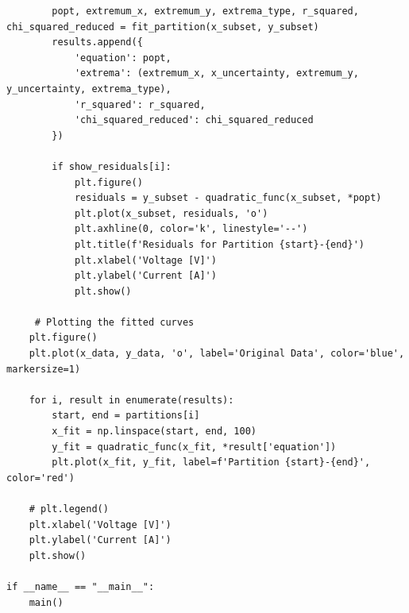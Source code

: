 \documentclass[12pt]{article}
\begin{document}
\begin{lstlisting}
        popt, extremum_x, extremum_y, extrema_type, r_squared, chi_squared_reduced = fit_partition(x_subset, y_subset)
        results.append({
            'equation': popt,  
            'extrema': (extremum_x, x_uncertainty, extremum_y, y_uncertainty, extrema_type), 
            'r_squared': r_squared,
            'chi_squared_reduced': chi_squared_reduced
        })

        if show_residuals[i]:
            plt.figure()  
            residuals = y_subset - quadratic_func(x_subset, *popt)
            plt.plot(x_subset, residuals, 'o')
            plt.axhline(0, color='k', linestyle='--')  
            plt.title(f'Residuals for Partition {start}-{end}')
            plt.xlabel('Voltage [V]')  
            plt.ylabel('Current [A]')
            plt.show()

     # Plotting the fitted curves 
    plt.figure()  
    plt.plot(x_data, y_data, 'o', label='Original Data', color='blue', markersize=1) 

    for i, result in enumerate(results):
        start, end = partitions[i] 
        x_fit = np.linspace(start, end, 100)  
        y_fit = quadratic_func(x_fit, *result['equation'])
        plt.plot(x_fit, y_fit, label=f'Partition {start}-{end}', color='red')

    # plt.legend()
    plt.xlabel('Voltage [V]')  
    plt.ylabel('Current [A]')
    plt.show()

if __name__ == "__main__":
    main()
\end{lstlisting}
\newpage
\end{document}
